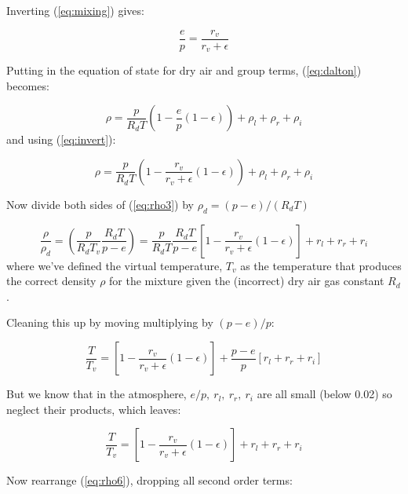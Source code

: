 \documentclass[12pt]{article}
\begin{document}
Inverting (\ref{eq:mixing}) gives:

\begin{equation}
  \label{eq:invert}
  \frac{e}{p} = \frac{r_v}{r_v + \epsilon}
\end{equation}

Putting in the equation of state for dry air and group terms, (\ref{eq:dalton}) becomes:

\begin{equation}
  \label{eq:rho2}
      \rho = \frac{p}{R_d T} \left ( 1 - \frac{e}{p} (1 - \epsilon) \right ) + \rho_l + \rho_r + \rho_i
\end{equation}
and using (\ref{eq:invert}):

\begin{equation}
  \label{eq:rho3}
      \rho = \frac{p}{R_d T} \left ( 1 - \frac{r_v}{r_v + \epsilon} (1 - \epsilon) \right ) + \rho_l + \rho_r + \rho_i
\end{equation}

Now divide both sides of (\ref{eq:rho3}) by $\rho_d = (p-e)/(R_d T)$

\begin{equation}
  \label{eq:rho4}
  \frac{\rho}{\rho_d} = \left ( \frac{p}{R_d T_v} \frac{R_d T}{p -e} \right ) =
\frac{p}{R_d T} \frac{R_d T}{p-e} \left [ 1 -  \frac{r_v}{r_v + \epsilon} (1 - \epsilon) \right ] + r_l + r_r  + r_i
\end{equation}
where we've defined the virtual temperature, $T_v$ as the temperature that produces the correct
density $\rho$ for the mixture given the (incorrect) dry air gas constant $R_d$.

Cleaning this up by moving multiplying by $(p-e)/p$:

\begin{equation}
  \label{eq:rho5}
 \frac{T}{ T_v} = 
 \left [ 1 -  \frac{r_v}{r_v + \epsilon} (1 - \epsilon) \right ] +  \frac{p-e}{p} \left [ r_l + r_r  + r_i \right ] 
\end{equation}

But we know that in the atmosphere, $e/p,\ r_l,\ r_r,\ r_i$ are all small (below 0.02) so 
neglect their products, which leaves:

\begin{equation}
  \label{eq:rho6}
 \frac{T}{ T_v} = 
 \left [ 1 -  \frac{r_v}{r_v + \epsilon} (1 - \epsilon) \right ] +   r_l + r_r  + r_i 
\end{equation}
 
Now rearrange (\ref{eq:rho6}), dropping all second order terms:
\end{document}
